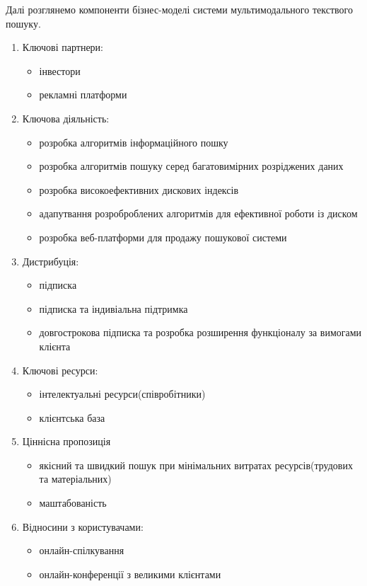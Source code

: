 Далі розглянемо компоненти бізнес-моделі системи мультимодального текствого пошуку.\\
\begin{enumerate}
	\item Ключові партнери:
	\begin{itemize}
		\item інвестори
		\item рекламні платформи
	\end{itemize}
	\item Ключова діяльність:
	\begin{itemize}
		\item розробка алгоритмів інформаційного пошку
		\item розробка алгоритмів пошуку серед багатовимірних розріджених даних
		\item розробка високоефективних дискових індексів
		\item адапутвання розроброблених алгоритмів для ефективної роботи із диском
		\item розробка веб-платформи для продажу пошукової системи
	\end{itemize}
	\item Дистрибуція:
	\begin{itemize}
		\item підписка
		\item підписка та індивіальна підтримка
		\item довгострокова підписка та розробка розширення функціоналу за вимогами клієнта
	\end{itemize}
	\item Ключові ресурси:
	\begin{itemize}
		\item інтелектуальні ресурси(співробітники)
		\item клієнтська база
	\end{itemize}
	\item Ціннісна пропозиція
	\begin{itemize}
		\item якісний та швидкий пошук при мінімальних витратах ресурсів(трудових та матеріальних)
		\item маштабованість
	\end{itemize}
	\item Відносини з користувачами:
	\begin{itemize}
		\item онлайн-спілкування
		\item онлайн-конференції з великими клієнтами

\end{itemize}
\end{enumerate}
